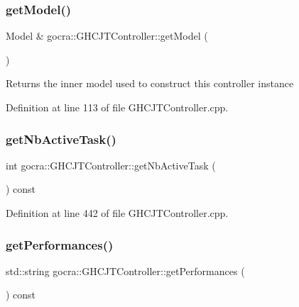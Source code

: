 \subsubsection{\texorpdfstring{get\+Model()}{getModel()}}
{\footnotesize\ttfamily Model \& gocra\+::\+G\+H\+C\+J\+T\+Controller\+::get\+Model (\begin{DoxyParamCaption}{ }\end{DoxyParamCaption})}

\begin{DoxyReturn}{Returns}
the inner model used to construct this controller instance 
\end{DoxyReturn}


Definition at line 113 of file G\+H\+C\+J\+T\+Controller.\+cpp.

\hypertarget{classgocra_1_1GHCJTController_a9c72545e3995937ae9448428ccce210b}{}\label{classgocra_1_1GHCJTController_a9c72545e3995937ae9448428ccce210b} 
\subsubsection{\texorpdfstring{get\+Nb\+Active\+Task()}{getNbActiveTask()}}
{\footnotesize\ttfamily int gocra\+::\+G\+H\+C\+J\+T\+Controller\+::get\+Nb\+Active\+Task (\begin{DoxyParamCaption}{ }\end{DoxyParamCaption}) const}



Definition at line 442 of file G\+H\+C\+J\+T\+Controller.\+cpp.

\hypertarget{classgocra_1_1GHCJTController_add50119553cb0f5de3f5639523968939}{}\label{classgocra_1_1GHCJTController_add50119553cb0f5de3f5639523968939} 
\subsubsection{\texorpdfstring{get\+Performances()}{getPerformances()}}
{\footnotesize\ttfamily std\+::string gocra\+::\+G\+H\+C\+J\+T\+Controller\+::get\+Performances (\begin{DoxyParamCaption}{ }\end{DoxyParamCaption}) const}

